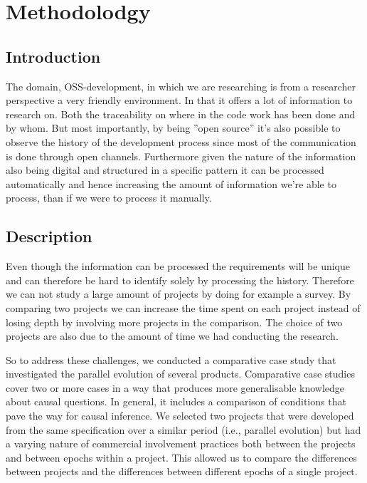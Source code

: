 \documentclass[a4paper,11pt]{article}
\begin{document}
{\section{Methodolodgy}
\subsection{Introduction}
The domain, OSS-development, in which we are researching is from a researcher perspective a very friendly environment. In that it offers a lot of information to research on. Both the traceability on where in the code work has been done and by whom. But most importantly, by being ''open source'' it's also possible to observe the history of the development process since most of the communication is done through open channels. Furthermore given the nature of the information also being digital and structured in a specific pattern it can be processed automatically and hence increasing the amount of information we're able to process, than if we were to process it manually.

\subsection{Description}



	

Even though the information can be processed the requirements will be unique and can therefore be hard to identify solely by processing the history. Therefore we can not study a large amount of projects by doing for example a survey. By comparing two projects we can increase the time spent on each project instead of losing depth by involving more projects in the comparison. The choice of two projects are also due to the amount of time we had conducting the research.

So to address these challenges, we conducted a comparative case study that investigated the parallel evolution of several products. Comparative case studies cover two or more cases in a way that produces more generalisable knowledge about causal questions\cite{Goodrick2014}. In general, it includes a comparison of conditions that pave the way for causal inference. We selected two projects that were developed from the same specification over a similar period (i.e., parallel evolution) but had a varying nature of commercial involvement practices both between the projects and between epochs within a project. This allowed us to compare the differences between projects and the differences between different epochs of a single project. 


}
\end{document}
